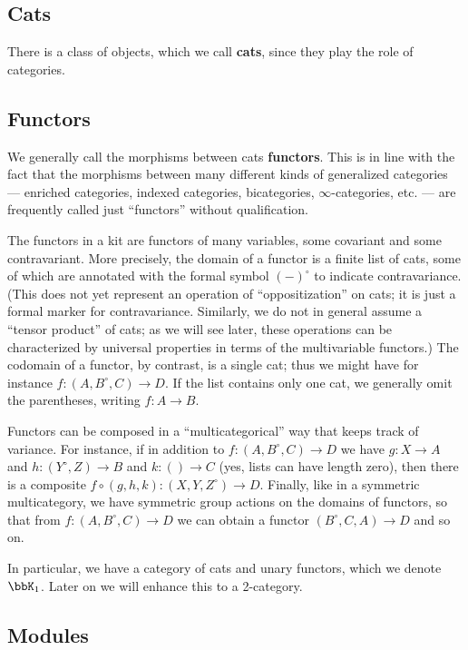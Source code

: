 \documentclass{amsart}
\newcommand{\K}{\bbK}
\renewcommand{\o}{^{\circ}}
\begin{document}
\subsection{Cats}

There is a class of objects, which we call \textbf{cats}, since they play the role of categories.

\subsection{Functors}

We generally call the morphisms between cats \textbf{functors}.
This is in line with the fact that the morphisms between many different kinds of generalized categories --- enriched categories, indexed categories, bicategories, $\infty$-categories, etc. --- are frequently called just ``functors'' without qualification.

The functors in a kit are functors of many variables, some covariant and some contravariant.
More precisely, the domain of a functor is a finite list of cats, some of which are annotated with the formal symbol $(-)\o$ to indicate contravariance.
(This does not yet represent an operation of ``oppositization'' on cats; it is just a formal marker for contravariance.
Similarly, we do not in general assume a ``tensor product'' of cats; as we will see later, these operations can be characterized by universal properties in terms of the multivariable functors.)
The codomain of a functor, by contrast, is a single cat; thus we might have for instance $f:(A,B\o,C) \to D$.
If the list contains only one cat, we generally omit the parentheses, writing $f:A\to B$.

Functors can be composed in a ``multicategorical'' way that keeps track of variance.
For instance, if in addition to $f:(A,B\o,C) \to D$ we have $g:X \to A$ and $h:(Y\o,Z)\to B$ and $k:()\to C$ (yes, lists can have length zero), then there is a composite $f\circ (g,h,k) : (X,Y,Z\o)\to D$.
Finally, like in a symmetric multicategory, we have symmetric group actions on the domains of functors, so that from $f:(A,B\o,C) \to D$ we can obtain a functor $(B\o,C,A)\to D$ and so on.

In particular, we have a category of cats and unary functors, which we denote $\K_1$.
Later on we will enhance this to a 2-category.

\subsection{Modules}
\end{document}
